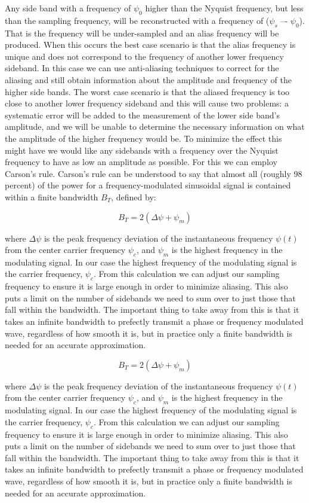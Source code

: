\documentclass[onecolumn, groupedaddress, 10pt]{revtex4-1}
\begin{document}
Any side band with a frequency of $\psi_0$ higher than the Nyquist frequency, but less than the sampling frequency, will be reconstructed with a frequency of ($\psi_s$ –- $\psi_0$). That is the frequency will be under-sampled and an alias frequency will be produced. When this occurs the best case scenario is that the alias frequency is unique and does not correspond to the frequency of another lower frequency sideband. In this case we can use anti-aliasing techniques to correct for the aliasing and still obtain information about the amplitude and frequency of the higher side bands. The worst case scenario is that the aliased frequency is too close to another lower frequency sideband and this will cause two problems: a systematic error will be added to the measurement of the lower side band’s amplitude, and we will be unable to determine the necessary information on what the amplitude of the higher frequency would be. To minimize the effect this might have we would like any sidebands with a frequency over the Nyquist frequency to have as low an amplitude as possible. For this we can employ Carson’s rule. Carson’s rule can be understood to say that almost all (roughly 98 percent) of the power for a frequency-modulated sinusoidal signal is contained within a finite bandwidth $B_T$, defined by:

\begin{equation}
B_T = 2(\Delta\psi + \psi_m)
\end{equation}

where $\Delta\psi$ is the peak frequency deviation of the instantaneous frequency $\psi(t)$ from the center carrier frequency $\psi_c$, and $\psi_m$ is the highest frequency in the modulating signal. In our case the highest frequency of the modulating signal is the carrier frequency, $\psi_c$. From this calculation we can adjust our sampling frequency to ensure it is large enough in order to minimize aliasing. This also puts a limit on the number  of sidebands we need to sum over to just those that fall within the bandwidth.  The important thing to take away from this is that it takes an infinite bandwidth to prefectly transmit a phase or frequency modulated wave, regardless of how smooth it is, but in practice only a finite bandwidth is needed for an accurate approximation.

\begin{equation}
B_T = 2(\Delta\psi + \psi_m)
\end{equation}

where $\Delta\psi$ is the peak frequency deviation of the instantaneous frequency $\psi(t)$ from the center carrier frequency $\psi_c$, and $\psi_m$ is the highest frequency in the modulating signal. In our case the highest frequency of the modulating signal is the carrier frequency, $\psi_c$. From this calculation we can adjust our sampling frequency to ensure it is large enough in order to minimize aliasing. This also puts a limit on the number  of sidebands we need to sum over to just those that fall within the bandwidth.  The important thing to take away from this is that it takes an infinite bandwidth to prefectly transmit a phase or frequency modulated wave, regardless of how smooth it is, but in practice only a finite bandwidth is needed for an accurate approximation.
 
\end{document}
